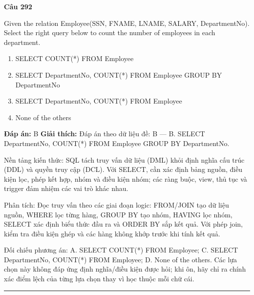 \documentclass[11pt,a4paper]{article}
\newenvironment{question}[1]{%
  \par\vspace{1em}\noindent\textbf{\large Câu #1}\par\vspace{0.4em}
}{%
  \par\vspace{1em}\hrule\vspace{0.6em}
}
\newenvironment{choices}{%
  \begin{enumerate}[label=\textbf{\Alph*.},leftmargin=2.2em,itemsep=2pt,topsep=3pt]
}{%
  \end{enumerate}
}
\newcommand{\choice}{\item}
\begin{document}
\begin{question}{292}
Given the relation Employee(SSN, FNAME, LNAME, SALARY, DepartmentNo). Select the right query below to count the number of employees in each department.
\begin{choices}
\choice SELECT COUNT(*) FROM Employee
\choice SELECT DepartmentNo, COUNT(*) FROM Employee GROUP BY DepartmentNo
\choice SELECT DepartmentNo, COUNT(*) FROM Employee
\choice None of the others
\end{choices}
\textbf{Đáp án:} B
\textbf{Giải thích:} Đáp án theo dữ liệu đề: B — B. SELECT DepartmentNo, COUNT(*) FROM Employee GROUP BY DepartmentNo.

Nền tảng kiến thức: SQL tách truy vấn dữ liệu (DML) khỏi định nghĩa cấu trúc (DDL) và quyền truy cập (DCL). Với SELECT, cần xác định bảng nguồn, điều kiện lọc, phép kết hợp, nhóm và điều kiện nhóm; các ràng buộc, view, thủ tục và trigger đảm nhiệm các vai trò khác nhau.

Phân tích: Đọc truy vấn theo các giai đoạn logic: FROM/JOIN tạo dữ liệu nguồn, WHERE lọc từng hàng, GROUP BY tạo nhóm, HAVING lọc nhóm, SELECT xác định biểu thức đầu ra và ORDER BY sắp kết quả. Với phép join, kiểm tra điều kiện ghép và các hàng không khớp trước khi tính kết quả.

Đối chiếu phương án: A. SELECT COUNT(*) FROM Employee; C. SELECT DepartmentNo, COUNT(*) FROM Employee; D. None of the others. Các lựa chọn này không đáp ứng định nghĩa/điều kiện được hỏi; khi ôn, hãy chỉ ra chính xác điểm lệch của từng lựa chọn thay vì học thuộc mỗi chữ cái.
\end{question}
\end{document}
